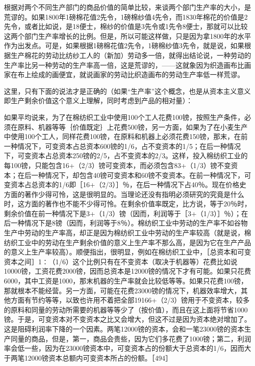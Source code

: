 根据对两个不同生产部门的商品价值的简单比较，来谈两个部门生产率的大小，是荒谬的。如果1800年1磅棉花值2先令，1磅棉纱值4先令，而1830年棉花的价值是2先令，或者比如说，是18便士，棉纱的价值是3先令或1先令8便士，那就可以比较这两个部门生产率增长的比例。但是，所以可能这样做，只是因为拿1800年的水平作为出发点。可是，如果根据1磅棉花值2先令，1磅棉纱值3先令，就是说，如果根据生产棉花的劳动比纺纱工人的（新加）劳动多一倍，就得出结论说，一种劳动的生产率比另一种劳动的生产率高一倍，这是荒谬的，——这就象因为织造画布比画家在布上绘成的画便宜，就说画家的劳动比织造画布的劳动生产率低一样荒谬。

这里，只有下面的说法才是正确的（如果“生产率”这个概念，也是从资本主义意义即生产剩余价值这个意义上理解，同时考虑到产品的相对量）：

如果平均说来，为了在棉纺织工业中使用100个工人花费100镑，按照生产条件，必须在原料、机器等等｛价值既定｝上花费500镑，另一方面，如果为了在小麦生产中使用100个工人，同样花费100镑，在原料和机器上必须花费150镑，那末，在前一种情况下，可变资本占总资本600镑的1/6，占不变资本的1/5；在后一种情况下，可变资本占总资本250镑的2/5，占不变资本的2/3。这样，投入棉纺织工业的每100镑，只能包含16+（2/3）镑可变资本，而必须包含83+（1/3）镑不变资本；在后一种情况下，却包含40镑可变资本和60镑不变资本。在前一种情况下，可变资本占总资本的1/6即［16+（2/3）］％，在后一种情况下占40％。现在价格史方面的著作少得可怜，这是很明显的。当理论还没有指明必须研究的究竟是什么时，这方面的著作也不能不少得可怜。在剩余价值率既定，比方说，等于20％时，剩余价值在前一种情况下是3+（1/3）镑（因而，利润等于［3+（1/3）］％）；在后一种情况下是8镑（因而，利润等于8％）。棉纺织工业中劳动的生产率不如谷物生产中劳动的生产率高，却正是因为棉纺织工业中劳动的生产率较高（就是说，棉纺织工业中的劳动在生产剩余价值的意义上生产率不那么高，是因为它在生产产品的意义上生产率较高）。顺便指出，很明显，例如在棉纺织工业中，［总资本和可变资本之间］1∶（1/6）这个比例只有在不变资本（取决于机器等）花费比如说10000镑，工资花费2000镑，因而总资本是12000镑的情况下才有可能。如果只花费6000，其中工资是1000，那末机器的生产率就会比较低等等。如果只花费100镑，那就根本不能经营。另一方面，可能在花费23000镑的情况下，机器效率增大，其他方面有节约等等，以致也许用不着把全部19166+（2/3）镑用于不变资本，较多的原料和同量的劳动所需要的机器等等少了（按价值），而且在这上面将节省1000镑。于是，可变资本对不变资本之比又会增大，但这不过是因为资本绝对增加了。这是阻碍利润率下降的一个因素。两笔12000镑的资本，会和一笔23000镑的资本生产同量的商品，但是，第一，商品会贵些，因为它们多花费了1000镑；第二，利润率会低一些，因为在23000镑资本中，可变资本占的份额大于总资本的1/6，因而大于两笔12000镑资本总额内可变资本所占的份额。［494］

